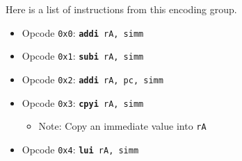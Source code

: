 \documentclass{article}
\begin{document}
	Here is a list of instructions from this encoding group.

	\singlespacing
	\begin{itemize}
		\item Opcode \texttt{0x0}:
			\texttt{\textbf{addi} rA, simm}
		\item Opcode \texttt{0x1}:
			\texttt{\textbf{subi} rA, simm}
		\item Opcode \texttt{0x2}:
			\texttt{\textbf{addi} rA, pc, simm}
		\item Opcode \texttt{0x3}:
			\texttt{\textbf{cpyi} rA, simm}
		\begin{itemize}
			\item Note:  Copy an immediate value into \texttt{rA}
		\end{itemize}
		\item Opcode \texttt{0x4}:
			\texttt{\textbf{lui} rA, simm}
		\begin{itemize}

\end{itemize}
\end{itemize}
\end{document}
